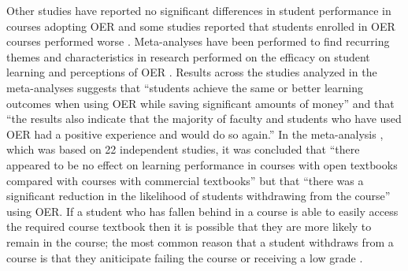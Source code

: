 \documentclass[11pt]{article}
\begin{document}
Other studies have reported no significant differences in student performance in courses adopting OER \cite{VC:18, VC-SK:19, YC-CC:17, RJ-FD-RL-KP:18, ML-OM-CT:08, CL-JL:18, WB-MC-KL:12, JH-DG:13, LF-JH:15, GA-AG-MM:15, OO-CH:17, TR:15, EC:17, CH-SR-GR:17, HR-CH-VM:18, JWS-JP:17} and some studies reported that students enrolled in OER courses performed worse \cite{YC-CC:17, RG:17, TR:15}.  Meta-analyses have been performed to find recurring themes and characteristics in research performed on the efficacy on student learning and perceptions of OER \cite{VC-SK:19, hilton:16, hilton:22}.  Results across the studies analyzed in the meta-analyses \cite{hilton:16, hilton:22} suggests that ``students achieve the same or better learning outcomes when using OER while saving significant amounts of money'' and that ``the results also indicate that the majority of faculty and students who have used OER had a positive experience and would do so again.''  In the meta-analysis \cite{VC-SK:19}, which was based on 22 independent studies, it was concluded that ``there appeared to be no effect on learning performance in courses with open textbooks compared with courses with commercial textbooks'' but that ``there was a significant reduction in the likelihood of students withdrawing from the course'' using OER.  If a student who has fallen behind in a course is able to easily access the required course textbook then it is possible that they are more likely to remain in the course; the most common reason that a student withdraws from a course is that they aniticipate failing the course or receiving a low grade \cite{EW-KB-HK:12}.
\end{document}
